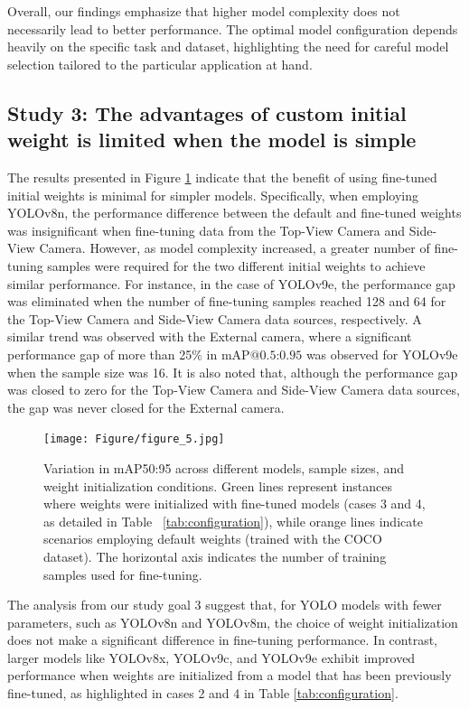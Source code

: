 Overall, our findings emphasize that higher model complexity does not necessarily lead to better performance. The optimal model configuration depends heavily on the specific task and dataset, highlighting the need for careful model selection tailored to the particular application at hand.



\subsection*{Study 3: The advantages of custom initial weight  is limited when the model is simple}


The results presented in Figure \ref{fig:finetune} indicate that the benefit of using fine-tuned initial weights is minimal for simpler models. Specifically, when employing YOLOv8n, the performance difference between the default and fine-tuned weights was insignificant when fine-tuning data from the Top-View Camera and Side-View Camera. However, as model complexity increased, a greater number of fine-tuning samples were required for the two different initial weights to achieve similar performance. For instance, in the case of YOLOv9e, the performance gap was eliminated when the number of fine-tuning samples reached 128 and 64 for the Top-View Camera and Side-View Camera data sources, respectively. A similar trend was observed with the External camera, where a significant performance gap of more than 25\% in $\text{mAP@{0.5:0.95}}$ was observed for YOLOv9e when the sample size was 16. It is also noted that, although the performance gap was closed to zero for the Top-View Camera and Side-View Camera data sources, the gap was never closed for the External camera. 
\begin{figure}[h]
    \centering
    \texttt{[image: Figure/figure\_5.jpg]}
    \caption{Variation in mAP50:95 across different models, sample sizes, and weight initialization conditions. Green lines represent instances where weights were initialized with fine-tuned models (cases 3 and 4, as detailed in Table ~\ref{tab:configuration}), while orange lines indicate scenarios employing default weights (trained with the COCO dataset). The horizontal axis indicates the number of training samples used for fine-tuning.}
    \label{fig:finetune}
\end{figure}


The analysis from our study goal 3 suggest that, for YOLO models with fewer parameters, such as YOLOv8n and YOLOv8m, the choice of weight initialization does not make a significant difference in fine-tuning performance. In contrast, larger models like YOLOv8x, YOLOv9c, and YOLOv9e exhibit improved performance when weights are initialized from a model that has been previously fine-tuned, as highlighted in cases 2 and 4 in Table \ref{tab:configuration}.

